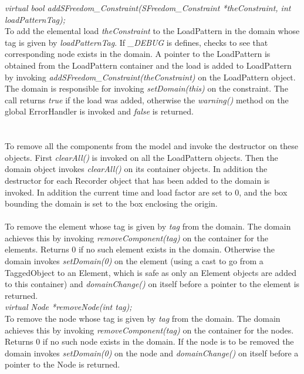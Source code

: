 {\em virtual bool addSFreedom\_Constraint(SFreedom\_Constraint *theConstraint, int
loadPatternTag);}  \\  
To add the elemental load {\em theConstraint} to the LoadPattern in the domain
whose tag is given by {\em loadPatternTag}.
If {\em \_DEBUG} is defines, checks to see that corresponding node
exists in the domain. A pointer to the LoadPattern is obtained from
the LoadPattern container and the load is added to LoadPattern by
invoking {\em addSFreedom\_Constraint(theConstraint)} on the LoadPattern object. The
domain is responsible for invoking {\em setDomain(this)} on the
constraint. The call returns {\em true} if the load was added, otherwise the
{\em warning()} method on the global ErrorHandler is invoked and {\em
false} is returned.\\ 


  \\
\\
To remove all the components from the model and invoke the destructor
on these objects. First {\em clearAll()} is invoked on all the
LoadPattern objects. Then the domain object invokes {\em
clearAll()} on its container objects. In addition the destructor for
each Recorder object that has been added to the domain is invoked. In
addition the current time and load factor are set to $0$, and the box
bounding the domain is set to the box enclosing the origin. \\


\\
To remove the element whose tag is given by {\em tag} from the
domain. The domain achieves this by invoking {\em
removeComponent(tag)} on the container for the elements. 
Returns $0$ if no such element exists in the domain. Otherwise 
the domain invokes {\em setDomain(0)} on the element (using a cast to
go from a TaggedObject to an Element, which is safe as only an
Element objects are added to this container) and {\em
domainChange()} on itself before a pointer to the element is returned. \\

{\em virtual Node *removeNode(int tag);}\\    
To remove the node whose tag is given by {\em tag} from the domain. 
The domain achieves this by invoking {\em
removeComponent(tag)} on the container for the nodes. 
Returns $0$ if no such node exists in the domain. If the node is to be
removed the domain invokes {\em setDomain(0)} on the node and {\em
domainChange()} on itself before a pointer to the Node is returned.\\ 

